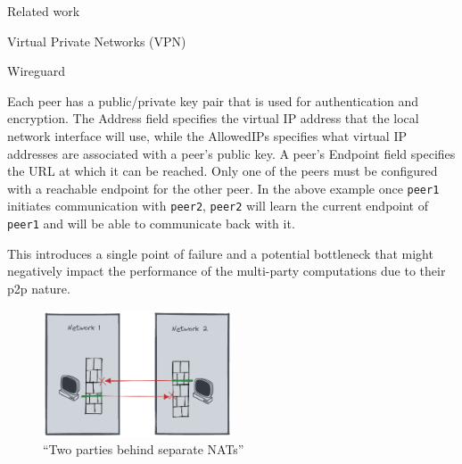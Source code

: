 \begin{frame}[fragile]{Related work}
\begin{block}{Virtual Private Networks (VPN)}
\begin{block}{Wireguard}
\begin{Shaded}
\begin{Highlighting}[]
\KeywordTok{[}\KeywordTok{]}
 \OperatorTok{=} \ErrorTok{/}
 \OperatorTok{=} 
 \OperatorTok{=} \ErrorTok{/}\ErrorTok{+}\OperatorTok{=}

\KeywordTok{[}\KeywordTok{]}
 \OperatorTok{=} \ErrorTok{/}\ErrorTok{+}\OperatorTok{=}
 \OperatorTok{=} \ErrorTok{/}
\end{Highlighting}
\end{Shaded}

Each peer has a public/private key pair that is used for authentication
and encryption. The Address field specifies the virtual IP address that
the local network interface will use, while the AllowedIPs specifies
what virtual IP addresses are associated with a peer's public key. A
peer's Endpoint field specifies the URL at which it can be reached. Only
one of the peers must be configured with a reachable endpoint for the
other peer. In the above example once \texttt{peer1} initiates
communication with \texttt{peer2}, \texttt{peer2} will learn the current
endpoint of \texttt{peer1} and will be able to communicate back with it.

This introduces a single point of failure and a potential bottleneck
that might negatively impact the performance of the multi-party
computations due to their \gls{p2p} nature.

\begin{figure}
\centering
\includegraphics[width=0.5\textwidth,height=0.25\textheight]{thesis/../figures/nat-intro.png}
\caption{``Two parties behind separate NATs''\label{nat-intro}}
\end{figure}


\end{block}
\end{block}
\end{frame}
